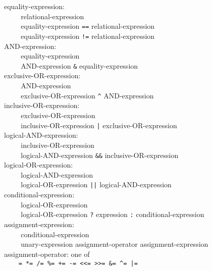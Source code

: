 \documentclass[12pt]{report}
\def\|{\verb|}
\begin{document}
\noindent
equality-expression:\\
\|    | relational-expression\\
\|    | equality-expression \verb+==+ relational-expression\\
\|    | equality-expression \verb+!=+ relational-expression\\

\noindent
AND-expression:\\
\|    | equality-expression\\
\|    | AND-expression \verb+&+ equality-expression\\

\noindent
exclusive-OR-expression:\\
\|    | AND-expression\\
\|    | exclusive-OR-expression \verb+^+ AND-expression\\

\noindent
inclusive-OR-expression:\\
\|    | exclusive-OR-expression\\
\|    | inclusive-OR-expression \verb+|+ exclusive-OR-expression\\

\noindent
logical-AND-expression:\\
\|    | inclusive-OR-expression\\
\|    | logical-AND-expression \verb+&&+ inclusive-OR-expression\\

\noindent
logical-OR-expression:\\
\|    | logical-AND-expression\\
\|    | logical-OR-expression \verb+||+ logical-AND-expression\\

\noindent
conditional-expression:\\
\|    | logical-OR-expression\\
\|    | logical-OR-expression \verb+?+ expression \verb+:+ conditional-expression\\

\noindent
assignment-expression:\\
\|    | conditional-expression\\
\|    | unary-expression assignment-operator assignment-expression\\

\noindent
assignment-operator: {\rm one of}\\
\|    | \verb#= *= /= %= += -= <<= >>= &= ^= |=#\\
\end{document}
